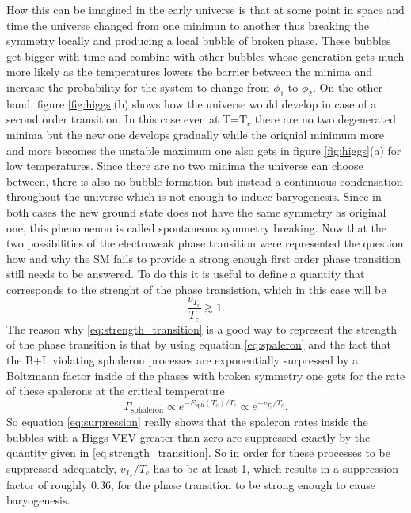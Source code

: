 How this can be imagined in the early universe is that at some point in space and time the universe changed from one minimun to another thus breaking the symmetry locally and producing a local bubble of broken phase. These bubbles get bigger with time and combine with other bubbles whose generation gets much more likely as the temperatures lowers the barrier between the minima and increase the probability for the system to change from $\phi_1$ to $\phi_2$. \newline\indent
On the other hand, figure \ref{fig:higgs}(b) shows how the universe would develop in case of a second order transition. In this case even at T=T$_c$ there are no two degenerated minima but the new one develops gradually while the orignial minimum more and more becomes the unstable maximum one also gets in figure \ref{fig:higgs}(a) for low temperatures. Since there are no two minima the universe can choose between, there is also no bubble formation but instead a continuous condensation throughout the universe which is not enough to induce baryogenesis. Since in both cases the new ground state does not have the same symmetry as original one, this phenomenon is called spontaneous symmetry breaking.\newline\indent
Now that the two possibilities of the electroweak phase transition were represented the question how and why the SM fails to provide a strong enough first order phase transition still needs to be answered. \newline\indent
To do this it is useful to define a quantity that corresponds to the strenght of the phase transistion, which in this case will be 
\begin{equation}
	\frac{v_{T_c}}{T_c}\gtrsim1.
	\label{eq:strength_transition}
\end{equation}
The reason why \eqref{eq:strength_transition} is a good way to represent the strength of the phase transition is that by using equation \eqref{eq:spaleron} and the fact that the B+L violating sphaleron processes are exponentially surpressed by a Boltzmann factor inside of the phases with broken symmetry one gets for the rate of these spalerons at the critical temperature
\begin{equation}
	\Gamma_\text{sphaleron}\propto e^{-E_\text{sph}(T_c)/T_c}\propto e^{-v_{T_c}/T_c}.
	\label{eq:surpression}
\end{equation}
So equation \eqref{eq:surpression} really shows that the spaleron rates inside the bubbles with a Higgs VEV greater than zero are suppressed exactly by the quantity given in \eqref{eq:strength_transition}. So in order for these processes to be suppressed adequately, $v_{T_c}/T_c$ has to be at least 1, which results in a suppression factor of roughly 0.36, for the phase transition to be strong enough to cause baryogenesis. \newline\indent 
